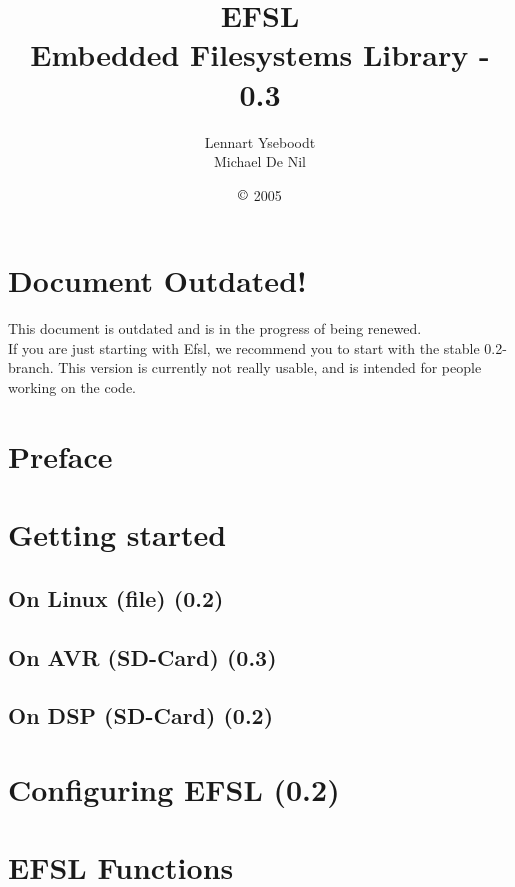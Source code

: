 \documentclass[a4paper,fleqn]{article}
\begin{document}
\title{\Huge{EFSL}\\\Large{Embedded Filesystems Library - 0.3}}
\author{Lennart Yseboodt\\Michael De Nil}
\date{$\copyright$ 2005}
\maketitle

\newpage
\tableofcontents

\setlength{\parindent}{0pt}
\setlength{\parskip}{1ex plus 0.5ex minus 0.2ex}

\newpage
\section{Document Outdated!}
{\Huge{
This document is outdated and is in the progress of being renewed.\\
\newline\newline
If you are just starting with Efsl, we recommend you to start with the stable
0.2-branch. This version is currently not really usable, and is intended for people
working on the code.
}}
\newpage
\section{Preface}

\newpage
\section{Getting started}
\subsection{On Linux (file) (0.2)}
	
\newpage
\subsection{On AVR (SD-Card) (0.3)}
	
\newpage
\subsection{On DSP (SD-Card) (0.2)}
	

\newpage
\section{Configuring EFSL (0.2)}
	

\newpage
\section{EFSL Functions}
\end{document}
